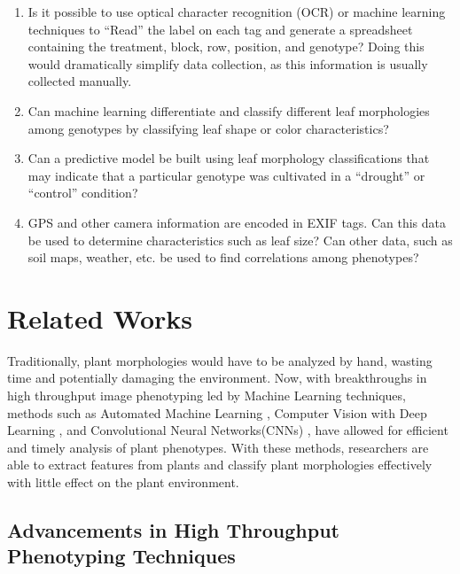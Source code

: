 \documentclass[final,5p,times,twocolumn,authoryear]{elsarticle}
\begin{document}
\begin{enumerate}

\item Is it possible to use optical character recognition (OCR) or machine learning techniques to “Read” the label on each tag and generate a spreadsheet containing the treatment, block, row, position, and genotype? Doing this would dramatically simplify data collection, as this information is usually collected manually.

\item Can machine learning differentiate and classify different leaf morphologies among genotypes by classifying leaf shape or color characteristics?

\item Can a predictive model be built using leaf morphology classifications that may indicate that a particular genotype was cultivated in a “drought” or “control” condition?

\item GPS and other camera information are encoded in EXIF tags. Can this data be used to determine characteristics such as leaf size? Can other data, such as soil maps, weather, etc. be used to find correlations among phenotypes?

\end{enumerate}

\section{Related Works}
\label{related_works}

Traditionally, plant morphologies would have to be analyzed by hand, wasting time and potentially damaging the environment. Now, with breakthroughs in high throughput image phenotyping led by Machine Learning techniques, methods such as Automated Machine Learning \citep{koh2021automated}, Computer Vision with Deep Learning \citep{mochida2019computer},  and Convolutional Neural Networks(CNNs) \citep{pound2017deep}, have allowed for efficient and timely analysis of plant phenotypes. With these methods, researchers are able to extract features from plants and classify plant morphologies effectively with little effect on the plant environment.

\subsection{Advancements in High Throughput Phenotyping Techniques}
\label{related_works_1}
\end{document}
